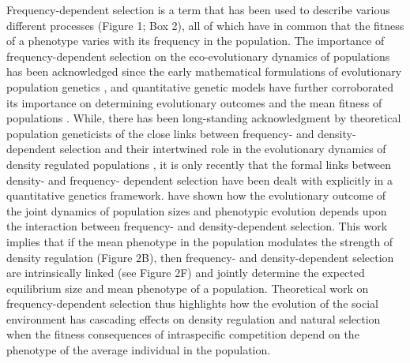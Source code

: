 \documentclass{article}
\begin{document}
Frequency-dependent selection is a term that has been used to describe various different processes (Figure 1; Box 2), all of which have in common that the fitness of a phenotype varies with its frequency in the population. The importance of frequency-dependent selection on the eco-evolutionary dynamics of populations has been acknowledged since the early mathematical formulations of evolutionary population genetics \citep{Fisher1930, Wright1948}, and quantitative genetic models have further corroborated its importance on determining evolutionary outcomes and the mean fitness of populations \citep{Lande1976, Lande2007, Svensson2018, Engen2020}. While, there has been long-standing acknowledgment by theoretical population geneticists of the close links between frequency- and density-dependent selection and their intertwined role in the evolutionary dynamics of density regulated populations \citep{Smouse1976, Anderson1983, Heino1998, Joshi2001}, it is only recently that the formal links between density- and frequency- dependent selection have been dealt with explicitly in a quantitative genetics framework. \cite{Engen2020} have shown how the evolutionary outcome of the joint dynamics of population sizes and phenotypic evolution depends upon the interaction between frequency- and density-dependent selection. This work implies that if the mean phenotype in the population modulates the strength of density regulation (Figure 2B), then frequency- and density-dependent selection are intrinsically linked (see Figure 2F) and jointly determine the expected equilibrium size and mean phenotype of a population. Theoretical work on frequency-dependent selection thus highlights how the evolution of the social environment has cascading effects on density regulation and natural selection when the fitness consequences of intraspecific competition depend on the phenotype of the average individual in the population. 
 
\end{document}
